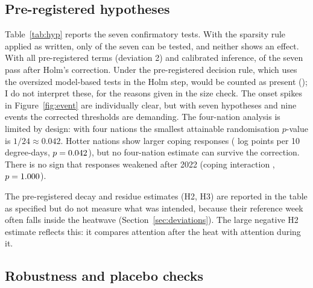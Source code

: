 \documentclass[11pt,a4paper]{article}
\begin{document}
\subsection{Pre-registered hypotheses}

Table~\ref{tab:hyp} reports the seven confirmatory tests. With the sparsity rule applied as written, only \NTestablePlan{} of the seven can be tested, and neither shows an effect. With all pre-registered terms (deviation 2) and calibrated inference, \NPresentCal{} of the seven pass after Holm's correction. Under the pre-registered decision rule, which uses the oversized model-based tests in the Holm step, \NPresentPrereg{} would be counted as present (\PresentPreregIDs); I do not interpret these, for the reasons given in the size check. The onset spikes in Figure~\ref{fig:event} are individually clear, but with seven hypotheses and nine events the corrected thresholds are demanding. The four-nation analysis is limited by design: with four nations the smallest attainable randomisation $p$-value is $1/24 \approx 0.042$. Hotter nations show larger coping responses (\DRCop{} log points per 10 degree-days, $p=0.042$), but no four-nation estimate can survive the correction. There is no sign that responses weakened after 2022 (coping interaction \HabCop, $p=1.000$).

The pre-registered decay and residue estimates (H2, H3) are reported in the table as specified but do not measure what was intended, because their reference week often falls inside the heatwave (Section~\ref{sec:deviations}). The large negative H2 estimate reflects this: it compares attention after the heat with attention during it.

\begin{table}[t]
\centering
\small
\caption{Pre-registered hypotheses. ``Plan'': sparsity rule as written. ``Dev.~2'': all pre-registered terms. $p$ RI: randomisation inference. Calibrated: deviation 3. H1: heat raises salience; H2: coping decays within two months; H3: no concern residue; H4: coping responds more than concern; H5a/b: hotter nations respond more (coping/concern); H6: habituation after 2022.}
\label{tab:hyp}
\resizebox{\textwidth}{!}{}
\end{table}

\subsection{Robustness and placebo checks}
\end{document}
